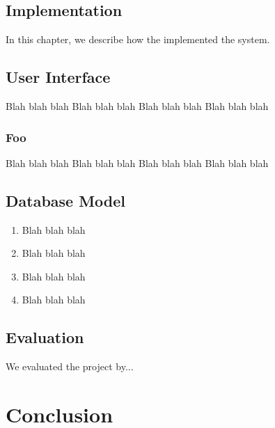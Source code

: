 \documentclass{l3proj}
\begin{document}
 


\section{Implementation}
\label{impl}

In this chapter, we describe how the implemented the system.

\section{User Interface}

Blah blah blah
Blah blah blah
Blah blah blah
Blah blah blah

\subsection{Foo}

Blah blah blah
Blah blah blah
Blah blah blah
Blah blah blah

\section{Database Model}

\begin{enumerate}
\item Blah blah blah
\item Blah blah blah
\item Blah blah blah
\item Blah blah blah
\end{enumerate}



\section{Evaluation}

We evaluated the project by...

\chapter{Conclusion}
\end{document}
